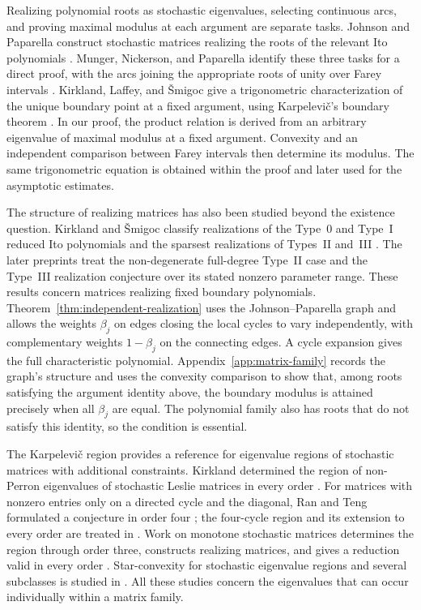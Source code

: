 \documentclass[11pt,a4paper]{article}
\theoremstyle{definition}
\theoremstyle{remark}
\numberwithin{equation}{section}
\begin{document}
Realizing polynomial roots as stochastic eigenvalues, selecting continuous arcs, and proving maximal modulus at each argument are separate tasks. Johnson and Paparella construct stochastic matrices realizing the roots of the relevant Ito polynomials \cite[Theorem~3.2]{JP}. Munger, Nickerson, and Paparella identify these three tasks for a direct proof, with the arcs joining the appropriate roots of unity over Farey intervals \cite[Proposition~1.2]{MNP}. Kirkland, Laffey, and \v{S}migoc give a trigonometric characterization of the unique boundary point at a fixed argument, using Karpelevi\v{c}'s boundary theorem \cite[Theorems~1.1 and~1.2]{KirklandLaffeySmigoc}. In our proof, the product relation is derived from an arbitrary eigenvalue of maximal modulus at a fixed argument. Convexity and an independent comparison between Farey intervals then determine its modulus. The same trigonometric equation is obtained within the proof and later used for the asymptotic estimates.

The structure of realizing matrices has also been studied beyond the existence question. Kirkland and \v{S}migoc classify realizations of the Type~0 and Type~I reduced Ito polynomials and the sparsest realizations of Types~II and~III \cite{KirklandSmigoc}. The later preprints \cite{VGTypeII,VGTypeIII} treat the non-degenerate full-degree Type~II case and the Type~III realization conjecture over its stated nonzero parameter range. These results concern matrices realizing fixed boundary polynomials. Theorem~\ref{thm:independent-realization} uses the Johnson--Paparella graph and allows the weights $\beta_j$ on edges closing the local cycles to vary independently, with complementary weights $1-\beta_j$ on the connecting edges. A cycle expansion gives the full characteristic polynomial. Appendix~\ref{app:matrix-family} records the graph's structure and uses the convexity comparison to show that, among roots satisfying the argument identity above, the boundary modulus is attained precisely when all $\beta_j$ are equal. The polynomial family also has roots that do not satisfy this identity, so the condition is essential.

The Karpelevi\v{c} region provides a reference for eigenvalue regions of stochastic matrices with additional constraints. Kirkland determined the region of non-Perron eigenvalues of stochastic Leslie matrices in every order \cite{KirklandLeslie}. For matrices with nonzero entries only on a directed cycle and the diagonal, Ran and Teng formulated a conjecture in order four \cite[Conjecture~20]{RanTeng}; the four-cycle region and its extension to every order are treated in \cite{VagenendeFourCycle,VGNCycle}. Work on monotone stochastic matrices determines the region through order three, constructs realizing matrices, and gives a reduction valid in every order \cite{VagenendeMonotone}. Star-convexity for stochastic eigenvalue regions and several subclasses is studied in \cite{VagenendeStar}. All these studies concern the eigenvalues that can occur individually within a matrix family.
\end{document}
